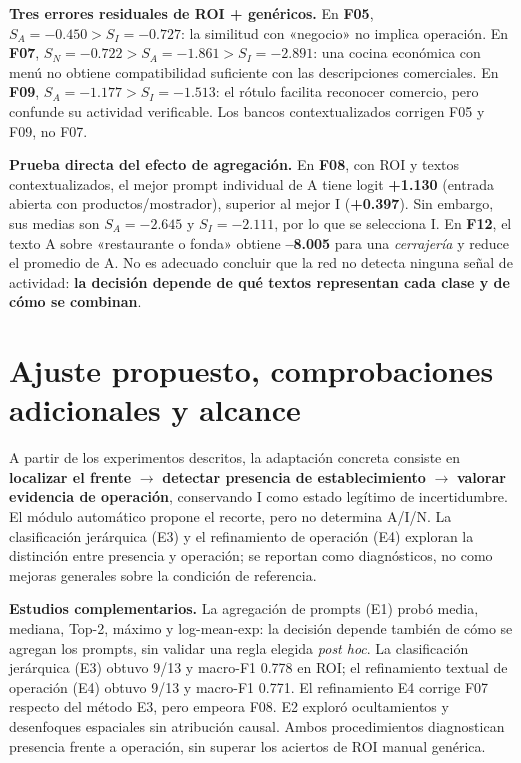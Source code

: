 \documentclass[10pt,a4paper]{article}
\newcommand{\fcase}[1]{\textbf{F#1}}
\begin{document}
\textbf{Tres errores residuales de ROI + genéricos.} En \fcase{05}, $S_A=-0.450>S_I=-0.727$: la similitud con «negocio» no implica operación. En \fcase{07}, $S_N=-0.722>S_A=-1.861>S_I=-2.891$: una cocina económica con menú no obtiene compatibilidad suficiente con las descripciones comerciales. En \fcase{09}, $S_A=-1.177>S_I=-1.513$: el rótulo facilita reconocer comercio, pero confunde su actividad verificable. Los bancos contextualizados corrigen F05 y F09, no F07.

\textbf{Prueba directa del efecto de agregación.} En \fcase{08}, con ROI y textos contextualizados, el mejor prompt individual de A tiene logit \textbf{+1.130} (entrada abierta con productos/mostrador), superior al mejor I (\textbf{+0.397}). Sin embargo, sus medias son $S_A=-2.645$ y $S_I=-2.111$, por lo que se selecciona I. En \fcase{12}, el texto A sobre «restaurante o fonda» obtiene \textbf{--8.005} para una \emph{cerrajería} y reduce el promedio de A. No es adecuado concluir que la red no detecta ninguna señal de actividad: \textbf{la decisión depende de qué textos representan cada clase y de cómo se combinan}.

\section{Ajuste propuesto, comprobaciones adicionales y alcance}

A partir de los experimentos descritos, la adaptación concreta consiste en \textbf{localizar el frente} $\to$ \textbf{detectar presencia de establecimiento} $\to$ \textbf{valorar evidencia de operación}, conservando I como estado legítimo de incertidumbre. El módulo automático propone el recorte, pero no determina A/I/N. La clasificación jerárquica (E3) y el refinamiento de operación (E4) exploran la distinción entre presencia y operación; se reportan como diagnósticos, no como mejoras generales sobre la condición de referencia.

\textbf{Estudios complementarios.} La agregación de prompts (E1) probó media, mediana, Top-2, máximo y log-mean-exp: la decisión depende también de cómo se agregan los prompts, sin validar una regla elegida \emph{post hoc}. La clasificación jerárquica (E3) obtuvo 9/13 y macro-F1 0.778 en ROI; el refinamiento textual de operación (E4) obtuvo 9/13 y macro-F1 0.771. El refinamiento E4 corrige F07 respecto del método E3, pero empeora F08. E2 exploró ocultamientos y desenfoques espaciales sin atribución causal. Ambos procedimientos diagnostican presencia frente a operación, sin superar los aciertos de ROI manual genérica.
\end{document}
